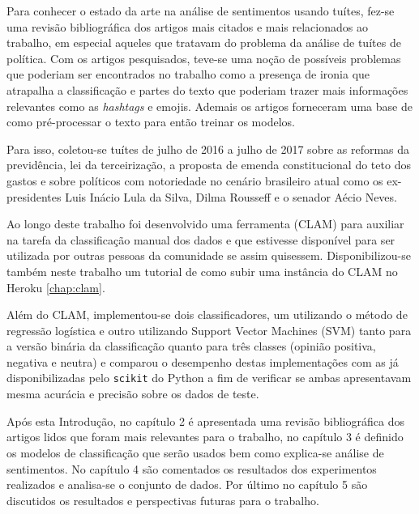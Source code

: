 Para conhecer o estado da arte na análise de sentimentos usando tuítes, fez-se uma revisão
bibliográfica dos artigos mais citados e mais relacionados ao trabalho, em especial aqueles
que tratavam do problema da análise de tuítes de política. Com os artigos pesquisados, teve-se uma
noção de possíveis problemas que poderiam ser encontrados no trabalho como a presença de ironia
que atrapalha a classificação e partes do texto que poderiam trazer mais informações relevantes
como as \textit{hashtags} e emojis. Ademais os artigos forneceram uma base de como pré-processar
o texto para então treinar os modelos.

Para isso, coletou-se tuítes de julho de 2016 a julho de 2017 sobre as reformas da previdência, lei
da terceirização, a proposta de emenda constitucional do teto dos gastos e sobre políticos
com notoriedade no cenário brasileiro atual como os ex-presidentes Luis Inácio Lula da Silva,
Dilma Rousseff e o senador Aécio Neves.

Ao longo deste trabalho foi desenvolvido uma ferramenta (CLAM) para auxiliar na tarefa da classificação 
manual dos dados e que estivesse disponível para ser utilizada por outras pessoas da comunidade
se assim quisessem. Disponibilizou-se também neste trabalho um tutorial de como subir uma instância
do CLAM no Heroku \ref{chap:clam}.

Além do CLAM, implementou-se dois classificadores, um utilizando o método de regressão logística
e outro utilizando Support Vector Machines (SVM) tanto para a versão binária da classificação quanto
para três classes (opinião positiva, negativa e neutra) e comparou o desempenho destas implementações
com as já disponibilizadas pelo \texttt{scikit} do Python a fim de verificar se ambas apresentavam mesma
acurácia e precisão sobre os dados de teste.

Após esta Introdução, no capítulo 2 é apresentada uma revisão bibliográfica dos artigos lidos que foram
mais relevantes para o trabalho, no capítulo 3 é definido os modelos de classificação que serão usados
bem como explica-se análise de sentimentos. No capítulo 4 são comentados os resultados dos experimentos
realizados e analisa-se o conjunto de dados. Por último no capítulo 5 são discutidos os resultados e
perspectivas futuras para o trabalho.